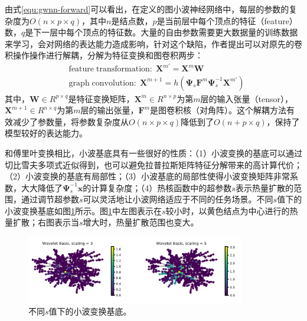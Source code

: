 \documentclass[final]{cvpr}
\begin{document}
由式\ref{equ:gwnn-forward}可以看出，在定义的图小波神经网络中，每层的参数的复杂度为$O \left( n \times p \times q \right)$，其中$n$是结点数，$p$是当前层中每个顶点的特征（feature）数，$q$是下一层中每个顶点的特征数。大量的自由参数需要更大数据量的训练数据来学习，会对网络的表达能力造成影响，针对这个缺陷，作者提出可以对原先的卷积操作操作进行解耦，分解为特征变换和图卷积两步：
\begin{align}
    &\mathrm{feature\;transformation:\;} 
    \boldsymbol{X}^{m'} =
    \boldsymbol{X}^{m}\boldsymbol{W} \label{gwnn-detach-1} 
    \\
    &\mathrm{graph\;convolution:\;} 
    \boldsymbol{X}^{m+1} =
    h \left(
    \boldsymbol{\Psi}_s \boldsymbol{F}^m
    \boldsymbol{\Psi}_s^{-1}\boldsymbol{X}^{m'}
    \right) \label{gwnn-detach-2} 
\end{align}
其中，$\boldsymbol{W} \in R^{p \times q}$是特征变换矩阵，$\boldsymbol{X}^{m} \in R^{n \times p}$为第$m$层的输入张量（tensor），$\boldsymbol{X}^{m+1} \in R^{n \times q}$为第$m$层的输出张量，$\boldsymbol{F}^m$是图卷积核（对角阵）。这个解耦方法有效减少了参数量，将参数复杂度从$O \left( n \times p \times q \right)$降低到了$O \left( n + p \times q \right)$，保持了模型较好的表达能力。

和傅里叶变换相比，小波基底具有一些很好的性质：（1）小波变换的基底可以通过切比雪夫多项式近似得到，也可以避免拉普拉斯矩阵特征分解带来的高计算代价；（2）小波变换的基底有局部性；（3）小波基底的局部性使得小波变换矩阵非常系数，大大降低了$\boldsymbol{\Psi}_s^{-1} \boldsymbol{x}$的计算复杂度；（4）热核函数中的超参数$s$表示热量扩散的范围，通过调节超参数$s$可以灵活地让小波网络适应于不同的任务场景。不同$s$值下的小波变换基底如图\ref{fig:GWNN-heatkernel}所示。图\ref{fig:GWNN-heatkernel}中左图表示在$s$较小时，以黄色结点为中心进行的热量扩散；右图表示当$s$增大时，热量扩散范围也变大。

\begin{figure}[htb!]
    \centering
    \includegraphics[width=0.85\textwidth]{GWNN-heatkernel.png}
    \caption{不同$s$值下的小波变换基底。}
    \label{fig:GWNN-heatkernel}
\end{figure}
\end{document}
